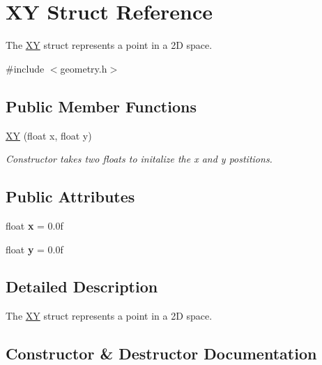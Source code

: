 \hypertarget{struct_x_y}{}\section{XY Struct Reference}
\label{struct_x_y}


The \hyperlink{struct_x_y}{XY} struct represents a point in a 2D space.  




{\ttfamily \#include $<$geometry.\+h$>$}

\subsection*{Public Member Functions}
\begin{DoxyCompactItemize}
\item 
\hyperlink{struct_x_y_af892d7ce4ec8ef817e791ab783159890}{XY} (float x, float y)
\begin{DoxyCompactList}\small\item\em Constructor takes two floats to initalize the x and y postitions. \end{DoxyCompactList}\end{DoxyCompactItemize}
\subsection*{Public Attributes}
\begin{DoxyCompactItemize}
\item 
float {\bfseries x} = 0.\+0f\hypertarget{struct_x_y_aaa157dbf77744771b3d6e21fb0a5c459}{}\label{struct_x_y_aaa157dbf77744771b3d6e21fb0a5c459}

\item 
float {\bfseries y} = 0.\+0f\hypertarget{struct_x_y_ac9538303385e630ba2526b2642232e1b}{}\label{struct_x_y_ac9538303385e630ba2526b2642232e1b}

\end{DoxyCompactItemize}


\subsection{Detailed Description}
The \hyperlink{struct_x_y}{XY} struct represents a point in a 2D space. 

\subsection{Constructor \& Destructor Documentation}
